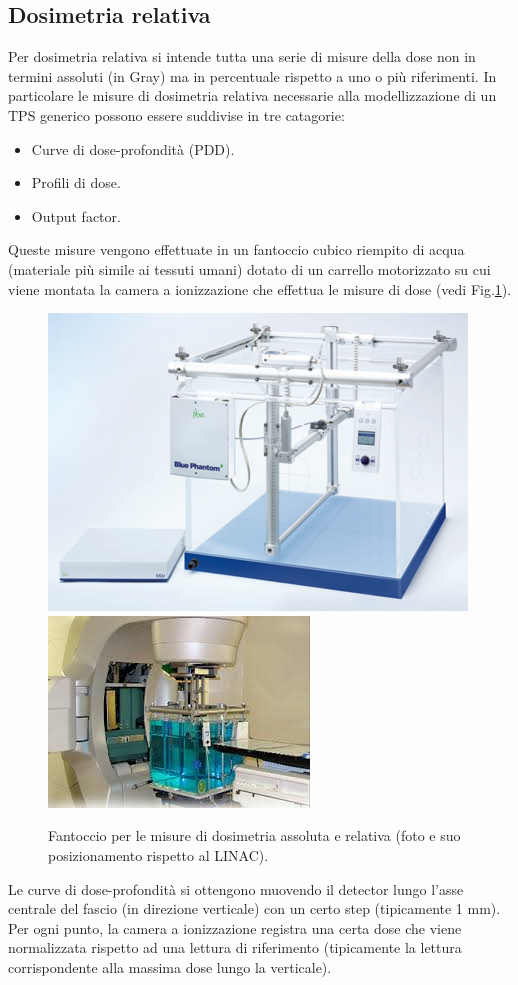 \subsection{Dosimetria relativa}
Per dosimetria relativa si intende tutta una serie di misure della dose non in termini assoluti (in Gray) ma in percentuale rispetto a uno o più riferimenti. In particolare le misure di dosimetria relativa necessarie alla modellizzazione di un TPS generico possono essere suddivise in tre catagorie:
\begin{itemize}
\item Curve di dose-profondità (PDD).
\item Profili di dose.
\item Output factor.
\end{itemize}
Queste misure vengono effettuate in un fantoccio cubico riempito di acqua (materiale più simile ai tessuti umani) dotato di un carrello motorizzato su cui viene montata la camera a ionizzazione che effettua le misure di dose (vedi Fig.\ref{fig:wphant}).
\begin{figure}[!t]
\centering
\includegraphics[width=.45\textwidth]{./cap2/wphant.jpg}
\includegraphics[width=.45\textwidth]{./cap2/wphant_pos.jpg}
\caption{Fantoccio per le misure di dosimetria assoluta e relativa (foto e suo posizionamento rispetto al LINAC).}
\label{fig:wphant}
\end{figure}

Le curve di dose-profondità si ottengono muovendo il detector lungo l'asse centrale del fascio (in direzione verticale) con un certo step (tipicamente 1 mm).\\
Per ogni punto, la camera a ionizzazione registra una certa dose che viene normalizzata rispetto ad una lettura di riferimento (tipicamente la lettura corrispondente alla massima dose lungo la verticale).

